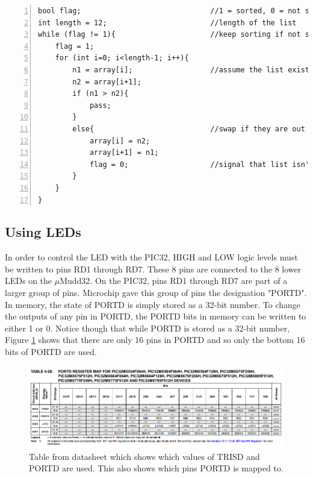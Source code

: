 \documentclass[11pt]{article}
\begin{document}
\begin{lstlisting}[numbers=left,basicstyle=\footnotesize]
bool flag;                              //1 = sorted, 0 = not sorted
int length = 12;                        //length of the list
while (flag != 1){                      //keep sorting if not sorted
    flag = 1;                           
    for (int i=0; i<length-1; i++){     
        n1 = array[i];                  //assume the list exists somewhere
        n2 = array[i+1];
        if (n1 > n2){
            pass;
        }
        else{                           //swap if they are out of order
            array[i] = n2;              
            array[i+1] = n1;
            flag = 0;                   //signal that list isn't sorted
        }
    }
}
\end{lstlisting}


\subsection{Using LEDs}

In order to control the LED with the PIC32, HIGH and LOW logic levels must be written to pins RD1 through RD7. These 8 pins are connected to the 8 lower LEDs on the $\mu$Mudd32. On the PIC32, pins RD1 through RD7 are part of a larger group of pins. Microchip gave this group of pins the designation "PORTD". In memory, the state of PORTD is simply stored as a 32-bit number. To change the outputs of any pin in PORTD, the PORTD bits in memory can be written to either 1 or 0. Notice though that while PORTD is stored as a 32-bit number, Figure \ref{fig:TRISD} shows that there are only 16 pins in PORTD and so only the bottom 16 bits of PORTD are used. \\

\begin{figure}[h!]
\centering
\includegraphics[scale=0.9,angle=90]{TRISD_and_PORTD.png}
\caption{Table from datasheet which shows which values of TRISD and PORTD are used. This also shows which pins PORTD is mapped to.}
\label{fig:TRISD}
\end{figure} 
\end{document}
